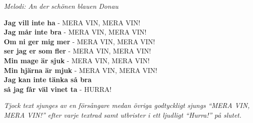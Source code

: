 {\footnotesize\textit{Melodi: An der schönen blauen Donau}}\par
\vspace{10pt}
\textbf{Jag vill inte ha} - MERA VIN, MERA VIN!\\
\textbf{Jag mår inte bra} - MERA VIN, MERA VIN!\\
\textbf{Om ni ger mig mer} - MERA VIN, MERA VIN!\\
\textbf{ser jag er som fler} - MERA VIN, MERA VIN!\\
\textbf{Min mage är sjuk} - MERA VIN, MERA VIN!\\
\textbf{Min hjärna är mjuk} - MERA VIN, MERA VIN!\\
\textbf{Jag kan inte tänka så bra}\\
\textbf{så jag får väl vinet ta} - HURRA!\par
\vspace{10pt}
{\footnotesize\textit{Tjock text sjunges av en försångare medan övriga godtyckligt sjungs ``MERA VIN, MERA VIN!'' efter varje textrad samt utbrister i ett ljudligt ``Hurra!'' på slutet.}}
